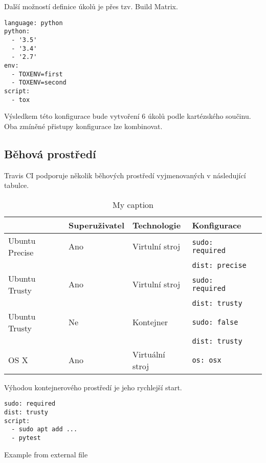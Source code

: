 Další možností definice úkolů je přes tzv. Build Matrix.

\begin{verbatim}
language: python
python:
  - '3.5'
  - '3.4'
  - '2.7'
env:
  - TOXENV=first
  - TOXENV=second
script:
  - tox
\end{verbatim}

Výsledkem této konfigurace bude vytvoření 6 úkolů podle kartézského součinu.
Oba zmíněné přistupy konfigurace lze kombinovat.


\subsection{Běhová prostředí}

Travis CI podporuje několik běhových prostředí vyjmenovaných v následující tabulce.

\begin{table}[h]
\centering
\caption{My caption}
\label{my-label}
\begin{tabular}{l|llll}
               & Superuživatel & Technologie & Konfigurace  \\ \hline
Ubuntu Precise & Ano & Virtulní stroj & \verb|sudo: required| &  \\ 
& & & \verb|dist: precise| &  \\ \hline
Ubuntu Trusty & Ano & Virtulní stroj & \verb|sudo: required|  &  \\
& & & \verb|dist: trusty| &  \\ \hline
Ubuntu Trusty & Ne & Kontejner & \verb|sudo: false|  &  \\
& & & \verb|dist: trusty| &  \\ \hline
OS X & Ano & Virtuální stroj & \verb|os: osx|  &  \\
\end{tabular}
\end{table}

Výhodou kontejnerového prostředí je jeho rychlejší start.


\begin{listing}[ht]
\begin{verbatim}
sudo: required
dist: trusty
script:
  - sudo apt add ...
  - pytest
\end{verbatim}
\caption{Example from external file}
\end{listing}




